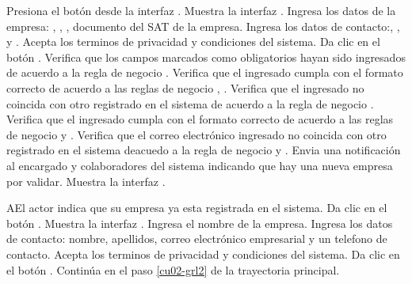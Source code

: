 \begin{UCtrayectoria}
	\UCpaso [\UCactor] Presiona el botón  desde la interfaz .
    \UCpaso [\UCsist] Muestra la interfaz .
	\UCpaso [\UCactor] Ingresa los datos de la empresa: , , 
	, documento del SAT de la empresa.\label{cu02-grl1}
	\UCpaso [\UCactor] Ingresa los datos de contacto:, , 
	 y .
	\UCpaso [\UCactor] Acepta los terminos de privacidad y condiciones del sistema.
	\UCpaso [\UCactor] Da clic en el botón . 
    \UCpaso [\UCsist] Verifica que los campos marcados como obligatorios hayan sido ingresados de acuerdo a la regla de negocio .
	\UCpaso [\UCsist] Verifica que el  ingresado cumpla con el formato correcto de acuerdo a las reglas de negocio  , .
	\UCpaso [\UCsist] Verifica que el  ingresado no coincida con otro registrado en el sistema de acuerdo a la regla de negocio  .
	\UCpaso [\UCsist] Verifica que el  ingresado cumpla con el formato correcto de acuerdo a las reglas de negocio   y  . \label{cu02-grl2}
	\UCpaso [\UCsist] Verifica que el correo electrónico ingresado no coincida con otro registrado en el sistema deacuedo a la regla de negocio   y .
	\UCpaso [\UCsist] Envia una notificación al encargado y colaboradores del sistema indicando que hay una nueva empresa por validar.
    \UCpaso [\UCsist] Muestra la interfaz .
\end{UCtrayectoria}

\begin{UCtrayectoriaA}{A}{El actor indica que su empresa ya esta registrada en el sistema.}
	\UCpaso [\UCactor] Da clic en el botón .
	\UCpaso [\UCsist] Muestra la interfaz .
	\UCpaso [\UCactor] Ingresa el nombre de la empresa.
	\UCpaso [\UCactor] Ingresa los datos de contacto: nombre, apellidos, correo electrónico empresarial y un telefono de contacto.
	\UCpaso [\UCactor] Acepta los terminos de privacidad y condiciones del sistema.
	\UCpaso [\UCactor] Da clic en el botón . 
	\UCpaso [\UCsist] Continúa en el paso \ref{cu02-grl2} de la trayectoria principal.
\end{UCtrayectoriaA} 

